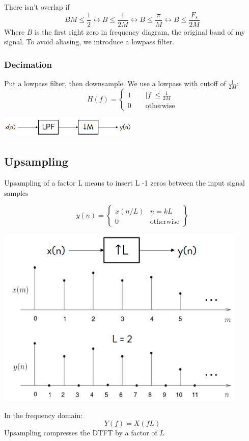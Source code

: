     There isn't overlap if
    $$
    BM\leq \frac{1}{2}\leftrightarrow B\leq\frac{1}{2M}\leftrightarrow B\leq\frac{\pi}{M}\leftrightarrow B\leq\frac{F_s}{2M}
    $$
    Where $B$ is the first right zero in frequency diagram, the original band of my signal. To avoid aliasing, we introduce a lowpass filter.

    \subsubsection{Decimation}
    Put a lowpass filter, then downsample. We use a lowpass with cutoff of $\frac{1}{2M}$:
    $$
    H(f)=\begin{cases}
        1\qquad |f|\leq\frac{1}{2M}\\
        0\qquad\text{otherwise}
    \end{cases}
    $$
    \begin{center}
        \includegraphics[width=0.5\textwidth]{images/downsampling_lpf.png}
    \end{center}

\subsection{Upsampling}
    Upsampling of a factor L means to insert L -1 zeros between the input signal samples
    \begin{LARGE}
        $$
        y(n)=\begin{Bmatrix}
            x(n/L) & n=kL\\
            0 & \text{otherwise}
        \end{Bmatrix}
        $$    
    \end{LARGE}
    \begin{center}
        \includegraphics[width=0.9\textwidth]{images/upsampling.png}
    \end{center}
    In the frequency domain:
    $$
    Y(f)=X(fL)
    $$
    Upsampling compresses the DTFT by a factor of $L$

